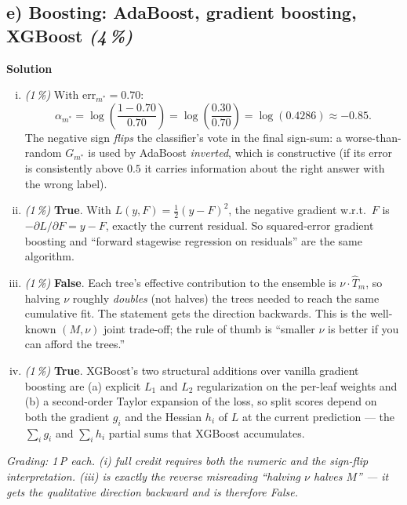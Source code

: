 \documentclass[11pt,a4paper]{article}
\newcommand{\subpoints}[1]{\textit{(#1\,\%)}}
\newcommand{\sol}{\noindent\textbf{Solution}}
\begin{document}
\subsection*{e) Boosting: AdaBoost, gradient boosting, XGBoost \subpoints{4}}
\sol{}
\begin{enumerate}[(i)]
  \item \subpoints{1} With $\mathrm{err}_{m^*} = 0.70$:
        $$\alpha_{m^*} = \log\!\left(\frac{1 - 0.70}{0.70}\right)
           = \log\!\left(\frac{0.30}{0.70}\right) = \log(0.4286) \approx \boxed{-0.85}.$$
        The negative sign \emph{flips} the classifier's vote in the final sign-sum: a worse-than-random
        $G_{m^*}$ is used by AdaBoost \emph{inverted}, which is constructive (if its error is
        consistently above $0.5$ it carries information about the right answer with the wrong
        label).
  \item \subpoints{1} \textbf{True}. With $L(y, F) = \tfrac{1}{2}(y - F)^2$, the negative gradient
        w.r.t.\ $F$ is $-\partial L/\partial F = y - F$, exactly the current residual. So squared-error
        gradient boosting and ``forward stagewise regression on residuals'' are the same algorithm.
  \item \subpoints{1} \textbf{False}. Each tree's effective contribution to the ensemble is
        $\nu\cdot\hat T_m$, so halving $\nu$ roughly \emph{doubles} (not halves) the trees needed to
        reach the same cumulative fit. The statement gets the direction backwards. This is the
        well-known $(M, \nu)$ joint trade-off; the rule of thumb is ``smaller $\nu$ is better if you
        can afford the trees.''
  \item \subpoints{1} \textbf{True}. XGBoost's two structural additions over vanilla gradient
        boosting are (a) explicit $L_1$ and $L_2$ regularization on the per-leaf weights and
        (b) a second-order Taylor expansion of the loss, so split scores depend on both the
        gradient $g_i$ and the Hessian $h_i$ of $L$ at the current prediction --- the
        $\sum_i g_i$ and $\sum_i h_i$ partial sums that XGBoost accumulates.
\end{enumerate}

\noindent\emph{Grading: 1\,P each. (i) full credit requires both the numeric and the sign-flip
interpretation. (iii) is exactly the reverse misreading ``halving $\nu$ halves $M$'' --- it gets
the qualitative direction backward and is therefore False.}
\end{document}
